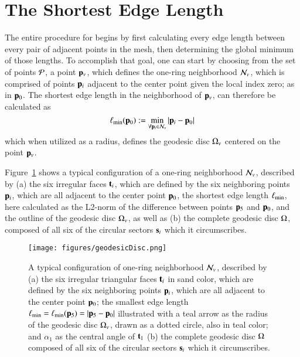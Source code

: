 \section{The Shortest Edge Length}
\label{ch3sSEL}
The entire procedure for  begins by first calculating every edge length between every pair of adjacent points in the mesh, then determining the global minimum of those lengths. To accomplish that goal, one can start by choosing from the set of points $\mathcal{P}$, a point $\mathbf{p}_v$, which defines the one-ring neighborhood $\mathcal{N}_v$, which is comprised of points $\mathbf{p}_i$ adjacent to the center point given the local index zero; as in $\mathbf{p}_0$. The shortest edge length in the neighborhood of $\mathbf{p}_v$, can therefore be calculated as
%
\begin{equation}
	\ell_\text{min}(\mathbf{p}_0) := \min_{\forall \mathbf{p}_i \in \mathcal{N}_v}|\mathbf{p}_i - \mathbf{p}_0|
	\label{eq:localMinimumEdgeLength}
\end{equation}%
%
%
%
which when utilized as a radius, defines the geodesic disc $\Omega_v$ centered on the point $\mathbf{p}_v$.

Figure~\ref{fig:geodesicDisc} shows a typical configuration of a one-ring neighborhood $\mathcal{N}_v$, described by (a) the six irregular faces $\mathbf{t}_i$, which are defined by the six neighboring points $\mathbf{p}_i$, which are all adjacent to the center point $\mathbf{p}_0$, the shortest edge length $\ell_\text{min}$, here calculated as the L2-norm of the difference between points $\mathbf{p}_5$ and $\mathbf{p}_0$, and the outline of the geodesic disc $\Omega_v$, as well as (b) the complete geodesic disc $\Omega$, composed of all six of the circular sectors $\mathbf{s}_i$ which it circumscribes.

\begin{figure}[ht]
\ffigbox
	{\texttt{[image: figures/geodesicDisc.png]}}
	{\caption[One-ring and geodesic disc]{A typical configuration of one-ring neighborhood $\mathcal{N}_v$, described by (a) the six irregular triangular faces $\mathbf{t}_i$ in sand color, which are defined by the six neighboring points $\mathbf{p}_i$, which are all adjacent to the center point $\mathbf{p}_0$; the smallest edge length $\ell_\text{min} = \ell_\text{min}(\mathbf{p}_5) = |\mathbf{p}_5 - \mathbf{p}_0|$ illustrated with a teal arrow as the radius of the geodesic disc $\Omega_v$, drawn as a dotted circle, also in teal color; and $\alpha_1$ as the central angle of $\mathbf{t}_1$ (b) the complete geodesic disc $\Omega$ composed of all six of the circular sectors $\mathbf{s}_i$ which it circumscribes.}\label{fig:geodesicDisc}}
\end{figure}%

